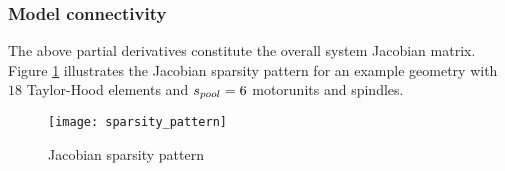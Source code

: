 \subsubsection{Model connectivity}
The above partial derivatives constitute the overall system Jacobian matrix.
Figure \ref{fig:jacpattern} illustrates the Jacobian sparsity pattern for an example geometry with $18$ Taylor-Hood elements and ${s_{pool}}=6$ motorunits and spindles.
\begin{figure}[!ht]
	\texttt{[image: sparsity\_pattern]}
	\caption{Jacobian sparsity pattern}
	\label{fig:jacpattern}
\end{figure}
